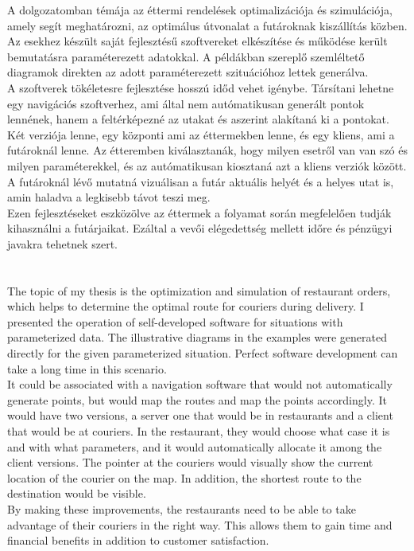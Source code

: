 
A dolgozatomban témája az éttermi rendelések optimalizációja és szimulációja, amely segít meghatározni, az optimálus útvonalat a futároknak kiszállítás közben. Az esekhez készült saját fejlesztésű szoftvereket elkészítése és működése került bemutatásra paraméterezett adatokkal. A példákban szereplő szemléltető diagramok direkten az adott paraméterezett szituációhoz lettek generálva.\\
A szoftverek tökéletesre fejlesztése hosszú időd vehet igénybe. Társítani lehetne egy navigációs szoftverhez, ami által nem autómatikusan generált pontok lennének, hanem a feltérképezné az utakat és aszerint alakítaná ki a pontokat. Két verziója lenne, egy központi ami az éttermekben lenne, és egy kliens, ami a futároknál lenne. Az étteremben kiválasztanák, hogy milyen esetről van van szó és milyen paraméterekkel, és az autómatikusan kiosztaná azt a kliens verziók között. A futároknál lévő mutatná vizuálisan a futár aktuális helyét és a helyes utat is, amin haladva a legkisebb távot teszi meg. \\ 
Ezen fejlesztéseket eszközölve az éttermek a folyamat során megfelelően tudják kihasználni a futárjaikat. Ezáltal a vevői elégedettség mellett időre és pénzügyi javakra tehetnek szert.
\\
\\
\\

The topic of my thesis is the optimization and simulation of restaurant orders, which helps to determine the optimal route for couriers during delivery. I presented the operation of self-developed software for situations with parameterized data. The illustrative diagrams in the examples were generated directly for the given parameterized situation. Perfect software development can take a long time in this scenario. \\
It could be associated with a navigation software that would not automatically generate points, but would map the routes and map the points accordingly. It would have two versions, a server one that would be in restaurants and a client that would be at couriers. In the restaurant, they would choose what case it is and with what parameters, and it would automatically allocate it among the client versions. The pointer at the couriers would visually show the current location of the courier on the map. In addition, the shortest route to the destination would be visible. \\
By making these improvements, the restaurants need to be able to take advantage of their couriers in the right way. This allows them to gain time and financial benefits in addition to customer satisfaction.